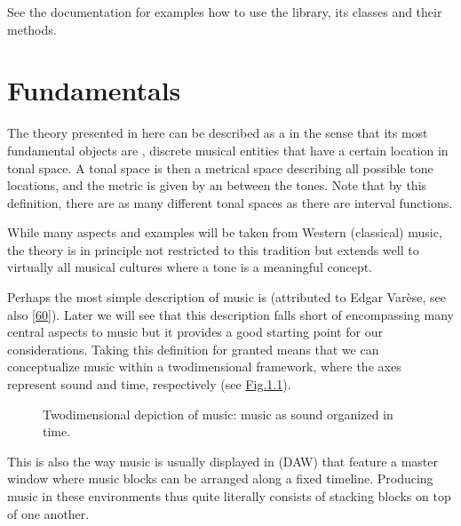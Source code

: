 \documentclass[letterpaper,10pt,english]{sphinxmanual}
\begin{document}
\sphinxAtStartPar
See the documentation {\hyperref[\detokenize{api:api}]{}} for examples how to use the library, its classes and their methods.


\chapter{Fundamentals}
\label{\detokenize{1_fundamentals:fundamentals}}\label{\detokenize{1_fundamentals::doc}}
\sphinxAtStartPar
The theory presented in here can be described as a  in the sense
that its most fundamental objects are , discrete musical entities that have
a certain location in tonal space.
A tonal space is then a metrical space describing all possible tone locations,
and the metric is given by an  between the tones. Note that by this definition,
there are as many different tonal spaces as there are interval functions.

\sphinxAtStartPar
While many aspects and examples will be taken
from Western (classical) music, the theory is in principle not restricted to this
tradition but extends well to virtually all musical cultures where a tone is a meaningful concept.

\sphinxAtStartPar
Perhaps the most simple description of music is  (attributed to
Edgar Varèse, see also {[}\hyperlink{cite.8_bibliography:id29}{60}{]}).
Later we will see that this description falls short of encompassing many central aspects to music
but it provides a good starting point for our considerations. Taking this definition for granted
means that we can conceptualize music within a two\sphinxhyphen{}dimensional framework, where the axes
represent sound and time, respectively (see \hyperref[\detokenize{1_fundamentals:fig-soundtime}]{Fig.\@ \ref{\detokenize{1_fundamentals:fig-soundtime}}}).
\begin{figure}[htbp]\centering\capstart{}\caption{Two\sphinxhyphen{}dimensional depiction of music: music as sound organized in time.}\label{\detokenize{1_fundamentals:id7}}\label{\detokenize{1_fundamentals:fig-soundtime}}\end{figure}
\sphinxAtStartPar
This is also the way music is usually displayed in  (DAW) that feature
a master window where music blocks can be arranged along a fixed timeline. Producing music in
these environments thus quite literally consists of stacking blocks on top of one another.
\end{document}
